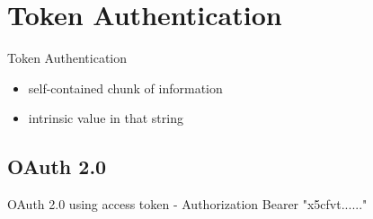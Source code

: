 \documentclass[9pt]{beamer}
\begin{document}

\section{Token Authentication}
\begin{frame}{Token Authentication}
  \begin{itemize}
    \item self-contained chunk of information
      \pause
    \item intrinsic value in that string
  \end{itemize}
\end{frame}


\subsection{OAuth 2.0}
\begin{frame}{OAuth 2.0}
  \pause
  using access token - Authorization Bearer "x5cfvt......"
\end{frame}

\end{document}
